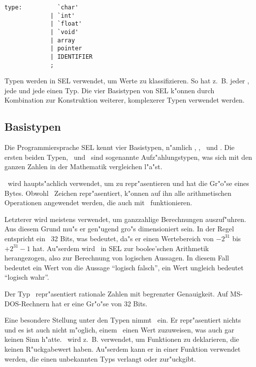 \begin{verbatim}
type:          `char'
             | `int'
             | `float'
             | `void'
             | array
             | pointer
             | IDENTIFIER
             ;
\end{verbatim}

Typen werden in SEL verwendet, um Werte
zu klassifizieren. So hat
z.~B. jeder , jede  und jede 
einen Typ. Die vier Basistypen von SEL k"onnen durch Kombination
zur Konstruktion weiterer, komplexerer Typen verwendet werden.

\subsection{Basistypen}

Die Programmiersprache SEL kennt vier Basistypen, n"amlich
\tchar , \tint , \tfloat\ und \tvoid . Die ersten beiden Typen,
\tchar\ und \tint\ sind sogenannte Aufz"ahlungstypen,
was sich mit den ganzen Zahlen in der Mathematik vergleichen l"a"st.

\tchar\ wird haupts"achlich verwendet, um  zu
repr"asentieren und hat die Gr"o"se eines Bytes. Obwohl \tchar\
Zeichen repr"asentiert, k"onnen auf ihn alle arithmetischen
Operationen angewendet werden, die auch mit \tint\ funktionieren.

Letzterer wird meistens verwendet, um ganzzahlige Berechnungen
auszuf"uhren. Aus diesem Grund mu"s er gen"ugend gro"s
dimensioniert sein. In der Regel entspricht ein \tint\ 32 Bits,
was bedeutet, da"s er einen Wertebereich von $-2^{31}$ bis
$+2^{31}-1$ hat. Au"serdem wird \tint\ in SEL zur boolee'schen
Arithmetik
herangezogen, also zur Berechnung von logischen
Aussagen. In diesem Fall bedeutet ein Wert von  die Aussage
"`logisch falsch"', ein Wert ungleich \fu{0} bedeutet "`logisch
wahr"'.

Der Typ \tfloat\ repr"asentiert rationale Zahlen
mit begrenzter Genauigkeit. Auf MS-DOS-Rechnern hat er eine Gr"o"se
von 32 Bits.

Eine besondere Stellung unter den Typen nimmt \tvoid\ ein. Er
repr"asentiert nichts und es ist auch nicht m"oglich, einem
\tvoid\ einen Wert zuzuweisen, was auch gar keinen Sinn h"atte.
\tvoid\ wird z.~B. verwendet, um Funktionen zu
deklarieren, die keinen R"uckgabewert
haben. Au"serdem kann er
in einer Funktion verwendet werden, die einen  unbekannten
Typs verlangt oder zur"uckgibt.

